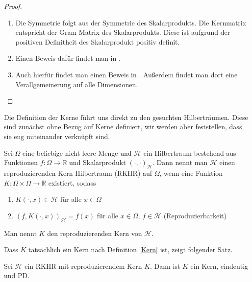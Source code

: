 \begin{proof}
$\mbox{}$
\begin{enumerate}
\item
Die Symmetrie folgt aus der Symmetrie des Skalarprodukts. Die Kernmatrix entspricht der Gram Matrix des Skalarprodukts. Diese ist aufgrund der positiven Definitheit des Skalarprodukt positiv definit. 
\item
Einen Beweis dafür findet man in \textcite[Theorem 6.10]{Wendland.2005}.
\item
Auch hierfür findet man einen Beweis in \textcite[Theorem 9.13]{Wendland.2005}. Außerdem findet man dort eine Verallgemeinerung auf alle Dimensionen.
\end{enumerate}
\end{proof}

Die Definition der Kerne führt uns direkt zu den gesuchten Hilberträumen. Diese sind zunächst ohne Bezug auf Kerne definiert, wir werden aber feststellen, dass sie eng miteinander verknüpft sind.

\begin{definition}
Sei $\Omega$ eine beliebige nicht leere Menge und $\mathcal{H}$ ein Hilbertraum bestehend aus Funktionen $f:\Omega \rightarrow \mathbb{R}$ und Skalarprodukt $(\cdot, \cdot)_\mathcal{H}$. Dann nennt man $\mathcal{H}$ einen reproduzierenden Kern Hilbertraum (\acs{RKHR}) auf $\Omega$, wenn eine Funktion $K:\Omega \times \Omega \rightarrow \mathbb{R}$ existiert, sodass
\begin{enumerate}
\item $K(\cdot, x) \in \mathcal{H}$ für alle $x \in \Omega$
\item $(f, K(\cdot,x))_\mathcal{H} = f(x)$ für alle $ x \in \Omega$, $f \in \mathcal{H}$ (Reproduzierbarkeit)
\end{enumerate}
Man nennt $K$ den reproduzierenden Kern von $\mathcal{H}$.
\end{definition}

Dass $K$ tatsächlich ein Kern nach Definition \ref{Kern} ist, zeigt folgender Satz.
\begin{theorem}
\label{thm:EindeutigkeitKern}
Sei $\mathcal{H}$ ein \gls{RKHR} mit reproduzierendem Kern $K$. Dann ist $K$ ein Kern, eindeutig und \ac{PD}.
\end{theorem}


